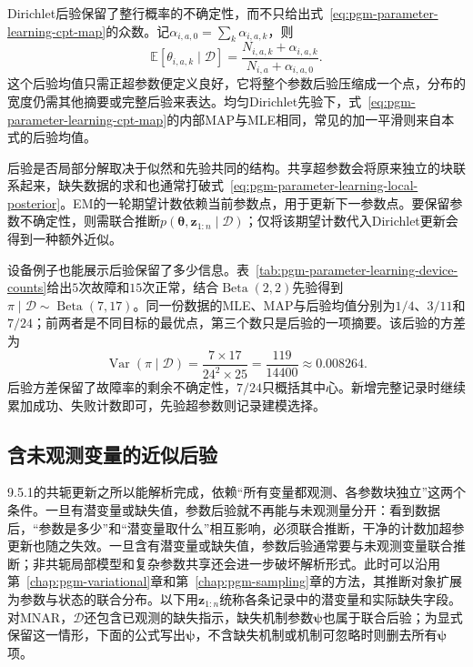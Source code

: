 Dirichlet后验保留了整行概率的不确定性，而不只给出式~\eqref{eq:pgm-parameter-learning-cpt-map}的众数。记$\alpha_{i,a,0}=\sum_k\alpha_{i,a,k}$，则
\begin{equation}
  \mathbb{E}[\theta_{i,a,k}\mid\mathcal{D}]
    =\frac{N_{i,a,k}+\alpha_{i,a,k}}
            {N_{i,a}+\alpha_{i,a,0}}.
  \label{eq:pgm-parameter-learning-dirichlet-estimates}
\end{equation}
这个后验均值只需正超参数便定义良好，它将整个参数后验压缩成一个点，分布的宽度仍需其他摘要或完整后验来表达。均匀Dirichlet先验下，式~\eqref{eq:pgm-parameter-learning-cpt-map}的内部MAP与MLE相同，常见的加一平滑则来自本式的后验均值。

后验是否局部分解取决于似然和先验共同的结构。共享超参数会将原来独立的块联系起来，缺失数据的求和也通常打破式~\eqref{eq:pgm-parameter-learning-local-posterior}。EM的一轮期望计数依赖当前参数点，用于更新下一参数点。要保留参数不确定性，则需联合推断$p(\bm{\theta},\bm{z}_{1:n}\mid\mathcal{D})$；仅将该期望计数代入Dirichlet更新会得到一种额外近似。

设备例子也能展示后验保留了多少信息。表~\ref{tab:pgm-parameter-learning-device-counts}给出$5$次故障和$15$次正常，结合$\operatorname{Beta}(2,2)$先验得到$\pi\mid\mathcal{D}\sim\operatorname{Beta}(7,17)$。同一份数据的MLE、MAP与后验均值分别为$1/4$、$3/11$和$7/24$；前两者是不同目标的最优点，第三个数只是后验的一项摘要。该后验的方差为
\[
  \operatorname{Var}(\pi\mid\mathcal{D})
   =\frac{7\times17}{24^2\times25}
   =\frac{119}{14400}\approx0.008264.
\]
后验方差保留了故障率的剩余不确定性，$7/24$只概括其中心。新增完整记录时继续累加成功、失败计数即可，先验超参数则记录建模选择。

\subsection{含未观测变量的近似后验}
\label{sec:pgm-parameter-learning-approximate-posterior}

9.5.1的共轭更新之所以能解析完成，依赖“所有变量都观测、各参数块独立”这两个条件。一旦有潜变量或缺失值，参数后验就不再能与未观测量分开：看到数据后，“参数是多少”和“潜变量取什么”相互影响，必须联合推断，干净的计数加超参更新也随之失效。一旦含有潜变量或缺失值，参数后验通常要与未观测变量联合推断；非共轭局部模型和复杂参数共享还会进一步破坏解析形式。此时可以沿用第~\ref{chap:pgm-variational}章和第~\ref{chap:pgm-sampling}章的方法，其推断对象扩展为参数与状态的联合分布。以下用$\bm{z}_{1:n}$统称各条记录中的潜变量和实际缺失字段。对MNAR，$\mathcal{D}$还包含已观测的缺失指示，缺失机制参数$\bm{\psi}$也属于联合后验；为显式保留这一情形，下面的公式写出$\bm{\psi}$，不含缺失机制或机制可忽略时则删去所有$\bm{\psi}$项。

